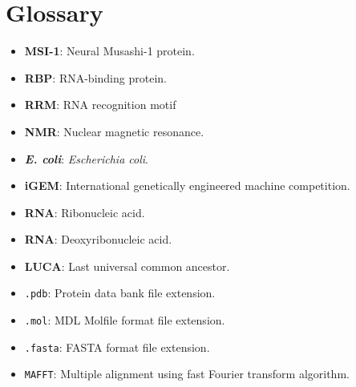 \section{Glossary}

\begin{itemize}
    \item[]\textbf{MSI-1}: Neural Musashi-1 protein.
    \item[]\textbf{RBP}: RNA-binding protein.
    \item[]\textbf{RRM}: RNA recognition motif
    \item[]\textbf{NMR}: Nuclear magnetic resonance.
    \item[]\textbf\textit{E. coli}: \textit{Escherichia coli}.
    \item[]\textbf{iGEM}: International genetically engineered machine competition.
    \item[]\textbf{RNA}: Ribonucleic acid.
    \item[]\textbf{RNA}: Deoxyribonucleic acid.
    \item[]\textbf{LUCA}: Last universal common ancestor.
    \item[]\texttt{.pdb}: Protein data bank file extension.
    \item[]\texttt{.mol}: MDL Molfile format file extension.
    \item[]\texttt{.fasta}: FASTA format file extension.
    \item[]\texttt{MAFFT}: Multiple alignment using fast Fourier transform algorithm.
\end{itemize}